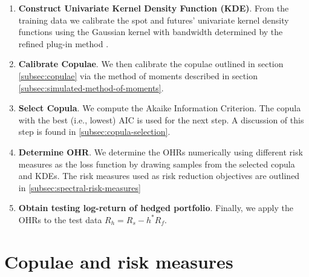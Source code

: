 \begin{enumerate}
\item \textbf{Construct Univariate Kernel Density Function (KDE)}.
  From the training data we calibrate the spot and futures'
  univariate kernel density functions using the Gaussian kernel with
  bandwidth determined by the refined plug-in method \citep[section
  3.3.3]{hardle2004nonparametric}.
\item \textbf{Calibrate Copulae}.
  We then calibrate the copulae outlined in section \ref{subsec:copulae} via the
  method of moments described in section \ref{subsec:simulated-method-of-moments}.
\item \textbf{Select Copula}.
  We compute the Akaike Information Criterion. The copula with the
  best (i.e., lowest) AIC is used for the next step. 
  A discussion of this step is found in \ref{subsec:copula-selection}.
\item \textbf{Determine OHR}.
  We determine the OHRs numerically using different risk measures as
  the loss function by drawing samples from the selected copula and
  KDEs. The risk measures used as risk reduction objectives are
  outlined in \ref{subsec:spectral-risk-measures} 
  \item \textbf{Obtain testing log-return of hedged portfolio}.
  Finally, we apply the OHRs to the test data $R_h = R_s - h^* R_f$.
  \end{enumerate}

\section{Copulae and risk measures}\label{sec:crm}








